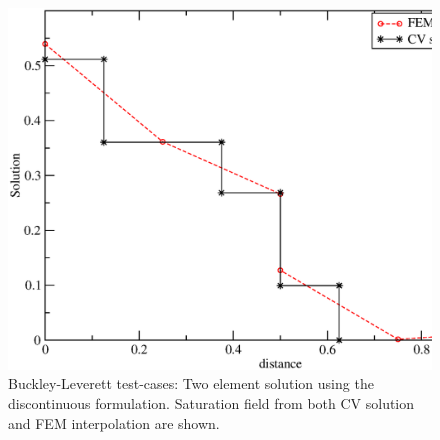 \begin{figure}[h]
\begin{center}
\includegraphics[width=1.\textwidth]{./diagrams/bl-dg-2eles}
\end{center}
\caption{Buckley-Leverett test-cases: Two element solution using the discontinuous formulation. Saturation field from both CV solution and FEM interpolation are shown.  \label{bl-dg-2eles}}
\end{figure}


